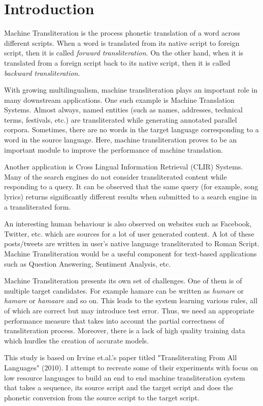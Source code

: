 \documentclass[11pt,a4paper]{article}
\begin{document}
\section{Introduction}
Machine Transliteration is the process phonetic translation of a word across different scripts. When a word is translated from its native script to foreign script, then it is called \textit{forward transliteration}. On the other hand, when it is translated from a foreign script back to its native script, then it is called \textit{backward transliteration}.
\par
With growing multilingualism, machine transliteration plays an important role in many downstream applications. One such example is Machine Translation Systems. Almost always, named entities (such as names, addresses, technical terms, festivals, etc.) are transliterated while generating annotated parallel corpora. Sometimes, there are no words in the target language corresponding to a word in the source language. Here, machine transliteration proves to be an important module to improve the performance of machine translation.
\par
Another application is Cross Lingual Information Retrieval (CLIR) Systems. Many of the search engines do not consider transliterated content while responding to a query. It can be observed that the same query (for example, song lyrics) returns significantly different results when submitted to a search engine in a transliterated form. 
\par
An interesting human behaviour is also observed on websites such as Facebook, Twitter, etc. which are sources for a lot of user generated content. A lot of these posts/tweets are written in user's native language transliterated to Roman Script. Machine Transliteration would be a useful component for text-based applications such as Question Answering, Sentiment Analysis, etc.
\par
Machine Transliteration presents its own set of challenges. One of them is of multiple target candidates. For example {hamare} can be written as \textit{humare} or \textit{hamare} or \textit{hamaare} and so on. This leads to the system learning various rules, all of which are correct but may introduce test error. Thus, we need an appropriate performance measure that takes into account the partial correctness of transliteration process. Moreover, there is a lack of high quality training data which hurdles the creation of accurate models.
\par
This study is based on Irvine et.al.'s paper titled "Transliterating From All Languages" (2010). I attempt to recreate some of their experiments with focus on low resource languages to build an end to end machine transliteration system that takes a sequence, its source script and the target script and does the phonetic conversion from the source script to the target script.
\end{document}
